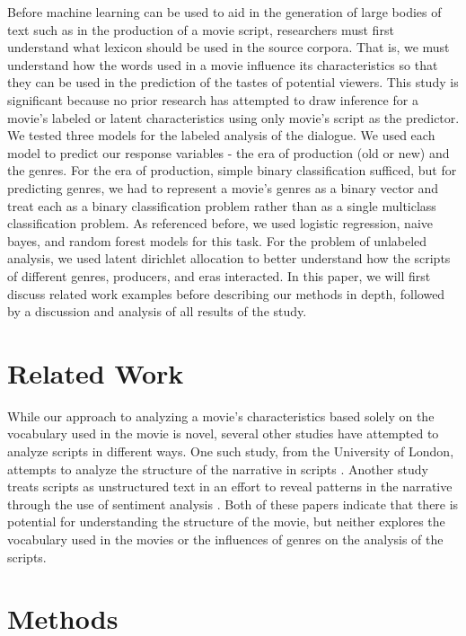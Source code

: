 \documentclass{article} %
\begin{document}
Before machine learning can be used to aid in the generation of large bodies of text such as in the production of a movie script, researchers must first understand what lexicon should be used in the source corpora. That is, we must understand how the words used in a movie influence its characteristics so that they can be used in the prediction of the tastes of potential viewers. This study is significant because no prior research has attempted to draw inference for a movie's labeled or latent characteristics using only movie's script as the predictor. We tested three models for the labeled analysis of the dialogue. We used each model to predict our response variables - the era of production (old or new) and the genres. For the era of production, simple binary classification sufficed, but for predicting genres, we had to represent a movie's genres as a binary vector and treat each as a binary classification problem rather than as a single multiclass classification problem. As referenced before, we used logistic regression, naive bayes, and random forest models for this task. For the problem of unlabeled analysis, we used latent dirichlet allocation to better understand how the scripts of different genres, producers, and eras interacted. In this paper, we will first discuss related work examples before describing our methods in depth, followed by a discussion and analysis of all results of the study.

\section{Related Work}

While our approach to analyzing a movie's characteristics based solely on the vocabulary used in the movie is novel, several other studies have attempted to analyze scripts in different ways. One such study, from the University of London, attempts to analyze the structure of the narrative in scripts \cite{film1}. Another study treats scripts as unstructured text in an effort to reveal patterns in the narrative through the use of sentiment analysis \cite{film2}. Both of these papers indicate that there is potential for understanding the structure of the movie, but neither explores the vocabulary used in the movies or the influences of genres on the analysis of the scripts.

\section{Methods}
\end{document}
